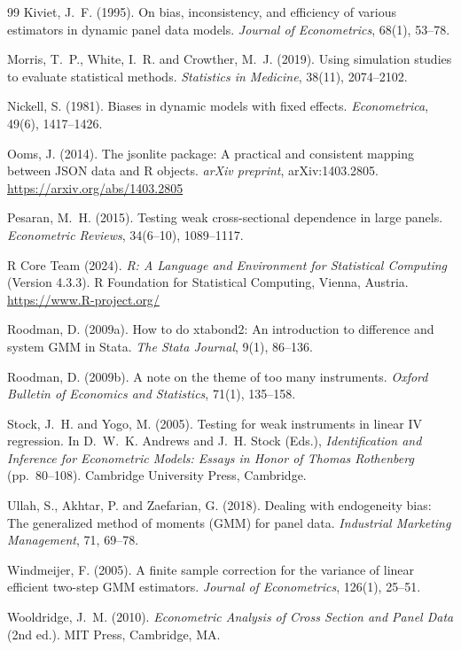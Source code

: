 \documentclass[11pt,a4paper]{article}
\begin{document}
\begin{thebibliography}{99}
Kiviet, J.~F. (1995). On bias, inconsistency, and efficiency of various estimators in dynamic panel data models. \emph{Journal of Econometrics}, 68(1), 53--78. 

Morris, T.~P., White, I.~R. and Crowther, M.~J. (2019). Using simulation studies to evaluate statistical methods. \emph{Statistics in Medicine}, 38(11), 2074--2102. 

Nickell, S. (1981). Biases in dynamic models with fixed effects. \emph{Econometrica}, 49(6), 1417--1426. 

Ooms, J. (2014). The jsonlite package: A practical and consistent mapping between JSON data and R objects. \emph{arXiv preprint}, arXiv:1403.2805. \url{https://arxiv.org/abs/1403.2805}

Pesaran, M.~H. (2015). Testing weak cross-sectional dependence in large panels. \emph{Econometric Reviews}, 34(6--10), 1089--1117. 

R Core Team (2024). \emph{R: A Language and Environment for Statistical Computing} (Version 4.3.3). R Foundation for Statistical Computing, Vienna, Austria. \url{https://www.R-project.org/}

Roodman, D. (2009a). How to do xtabond2: An introduction to difference and system GMM in Stata. \emph{The Stata Journal}, 9(1), 86--136. 

Roodman, D. (2009b). A note on the theme of too many instruments. \emph{Oxford Bulletin of Economics and Statistics}, 71(1), 135--158. 

Stock, J.~H. and Yogo, M. (2005). Testing for weak instruments in linear IV regression. In D.~W.~K. Andrews and J.~H. Stock (Eds.), \emph{Identification and Inference for Econometric Models: Essays in Honor of Thomas Rothenberg} (pp.\ 80--108). Cambridge University Press, Cambridge.

Ullah, S., Akhtar, P. and Zaefarian, G. (2018). Dealing with endogeneity bias: The generalized method of moments (GMM) for panel data. \emph{Industrial Marketing Management}, 71, 69--78. 

Windmeijer, F. (2005). A finite sample correction for the variance of linear efficient two-step GMM estimators. \emph{Journal of Econometrics}, 126(1), 25--51. 

Wooldridge, J.~M. (2010). \emph{Econometric Analysis of Cross Section and Panel Data} (2nd ed.). MIT Press, Cambridge, MA.

\end{thebibliography}
\end{document}
